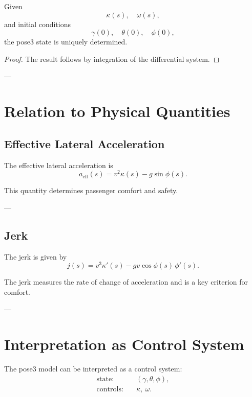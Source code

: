 \begin{proposition}
Given
\[
\kappa(s), \quad \omega(s),
\]
and initial conditions
\[
\gamma(0), \quad \theta(0), \quad \phi(0),
\]
the pose3 state is uniquely determined.
\end{proposition}

\begin{proof}
The result follows by integration of the differential system.
\end{proof}

---

\section{Relation to Physical Quantities}

\subsection{Effective Lateral Acceleration}

\begin{definition}
The effective lateral acceleration is
\[
a_{\mathrm{eff}}(s)
=
v^2 \kappa(s) - g \sin\phi(s).
\]
\end{definition}

\begin{remark}
This quantity determines passenger comfort and safety.
\end{remark}

---

\subsection{Jerk}

\begin{definition}
The jerk is given by
\[
j(s)
=
v^3 \kappa'(s) - g v \cos\phi(s)\,\phi'(s).
\]
\end{definition}

\begin{remark}
The jerk measures the rate of change of acceleration and is a key
criterion for comfort.
\end{remark}

---

\section{Interpretation as Control System}

\begin{remark}
The pose3 model can be interpreted as a control system:
\[
\begin{aligned}
\text{state:} &\quad (\gamma,\theta,\phi), \\
\text{controls:} &\quad \kappa, \ \omega.
\end{aligned}
\]
\end{remark}

